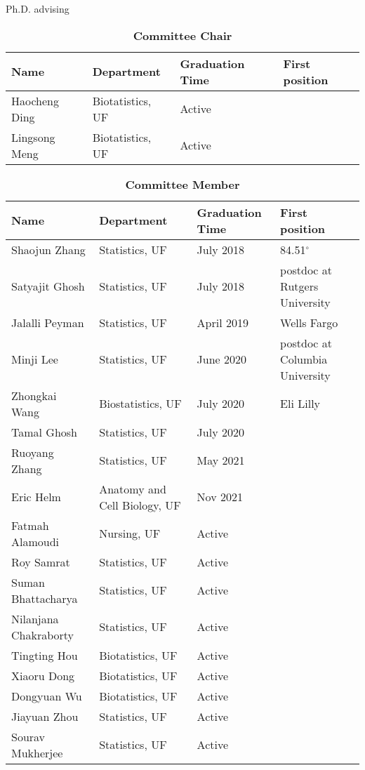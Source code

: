 \documentclass{resume} %
\begin{document}
\begin{rSection}{Ph.D. advising}

\begin{table}[htp]
\caption*{\textbf{Committee Chair}}
\begin{center}
\begin{tabular}{l l l l}
\hline
\hline
Name & Department & Graduation Time & First position \\
\hline
Haocheng Ding & Biotatistics, UF & Active &  \\
Lingsong Meng & Biotatistics, UF & Active &  \\
\hline
\hline
\end{tabular}
\end{center}
\label{default}
\end{table}%


\begin{table}[htp]
\caption*{\textbf{Committee Member}}
\begin{center}
\begin{tabular}{l l l l}
\hline
\hline
Name & Department & Graduation Time & First position \\
\hline
Shaojun Zhang & Statistics, UF & July 2018 & 84.51$^\circ$ \\
Satyajit Ghosh & Statistics, UF & July 2018 & postdoc at Rutgers University \\
Jalalli Peyman & Statistics, UF & April 2019 & Wells Fargo \\
Minji Lee & Statistics, UF & June 2020 &postdoc at Columbia University\\
Zhongkai Wang &  Biostatistics, UF & July 2020 & Eli Lilly \\
Tamal Ghosh & Statistics, UF & July 2020 & \\
Ruoyang Zhang & Statistics, UF & May 2021 & \\
Eric Helm &  Anatomy and Cell Biology, UF & Nov 2021 & \\
Fatmah Alamoudi & Nursing, UF & Active & \\
Roy Samrat & Statistics, UF & Active & \\
Suman Bhattacharya & Statistics, UF & Active & \\
Nilanjana Chakraborty & Statistics, UF & Active & \\
Tingting Hou & Biotatistics, UF & Active & \\
Xiaoru Dong & Biotatistics, UF & Active & \\
Dongyuan Wu & Biotatistics, UF & Active & \\
Jiayuan Zhou & Statistics, UF & Active & \\
Sourav Mukherjee & Statistics, UF & Active & \\
\hline
\hline
\end{tabular}
\end{center}
\label{default}
\end{table}%

\end{rSection}
\end{document}
